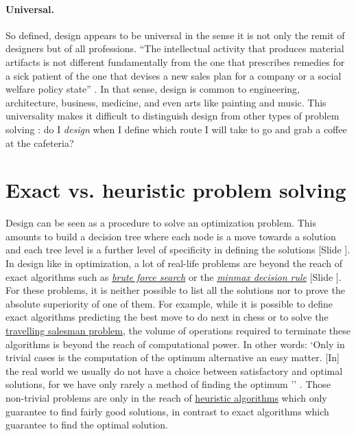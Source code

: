 \documentclass{article}
\newcounter{slide}
\begin{document}
\paragraph{Universal.} So defined, design appears to be universal in the sense it is not only the remit of designers but of all professions. ``The intellectual activity that produces material artifacts is not different fundamentally from the one that prescribes remedies for a sick patient of the one that devises a new sales plan for a company or a social welfare policy state'' \cite[p. 111]{simon1996sciences}. In that sense, design is common to engineering, architecture, business, medicine, and even arts like painting and music. This universality makes it difficult to distinguish design from other types of problem solving \cite{hatchuel2003new}: do I \emph{design} when I define which route I will take to go and grab a coffee at the cafeteria?

\section{Exact vs. heuristic problem solving}
\label{sec:GeneralProblemSolving}
Design can be seen as a procedure to solve an optimization problem. This amounts to build a decision tree where each node is a move towards a solution and each tree level is a further level of specificity in defining the solutions {\color{blue}[Slide ]}. In design like in optimization, a lot of real-life problems are beyond the reach of exact algorithms such as \emph{\href{https://en.wikipedia.org/wiki/Brute-force_search}{brute force search}} or the \emph{\href{https://en.wikipedia.org/wiki/Minimax}{minmax decision rule}} {\color{blue}[Slide ]}. For these problems, it is neither possible to list all the solutions nor to prove the absolute superiority of one of them. For example, while it is possible to define exact algorithms predicting the best move to do next in chess or to solve the \href{https://en.wikipedia.org/wiki/Travelling_salesman_problem}{travelling salesman problem}, the volume of operations required to terminate these algorithms is beyond the reach of computational power. In other words: `Only in trivial cases is the computation of the optimum alternative an easy matter. [In] the real world we usually do not have a choice between satisfactory and optimal solutions, for we have only rarely a method of finding the optimum '' \cite[p. 118-120]{simon1996sciences}. Those non-trivial problems are only in the reach of \href{https://en.wikipedia.org/wiki/Heuristic_(computer_science)}{heuristic algorithms} which only guarantee to find fairly good solutions, in contrast to exact algorithms which guarantee to find the optimal solution. 
\end{document}
